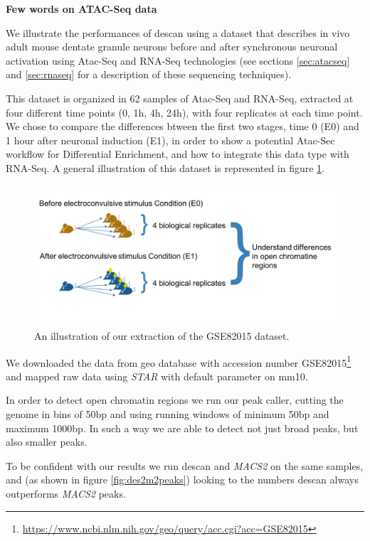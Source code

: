 \textbf{Few words on ATAC-Seq data}

We illustrate the performances of \gls{descan} using a dataset \cite{Su2017} that describes in vivo adult mouse dentate granule neurons before and after synchronous neuronal activation using Atac-Seq and RNA-Seq technologies (see sections \ref{sec:atacseq} and \ref{sec:rnaseq} for a description of these sequencing techniques).

This dataset is organized in 62 samples of Atac-Seq and RNA-Seq, extracted at four different time points (0, 1h, 4h, 24h), with four replicates at each time point.
We chose to compare the differences btween the first two stages, time 0 (E0) and 1 hour after neuronal induction (E1), in order to show a potential Atac-Sec workflow for Differential Enrichment, and how to integrate this data type with RNA-Seq. A general illustration of this dataset is represented in figure \ref{fig:atacdataset}.

\begin{figure}[H]
\includegraphics[width=\textwidth,height=\textheight,keepaspectratio]{img/descan2/dataset.png}
\caption[DEScan2 dataset illustration]{An illustration of our extraction of the GSE82015\cite{Su2017} dataset.}
\label{fig:atacdataset}
\centering
\end{figure}

We downloaded the data from \gls{geo} database \cite{Edgar2002, Barrett2013} with accession number GSE82015\footnote{\url{https://www.ncbi.nlm.nih.gov/geo/query/acc.cgi?acc=GSE82015}} and mapped raw data using \textit{STAR} \cite{Dobin2013} with default parameter on \gls{mm10}.

In order to detect open chromatin regions we run our peak caller, cutting the genome in bins of 50bp and using running windows of minimum 50bp and maximum 1000bp. In such a way we are able to detect not just broad peaks, but also smaller peaks.

To be confident with our results we run \gls{descan} and \textit{MACS2} on the same samples, and (as shown in figure \ref{fig:des2m2peaks}) looking to the numbers \gls{descan} always outperforms \textit{MACS2} peaks.

